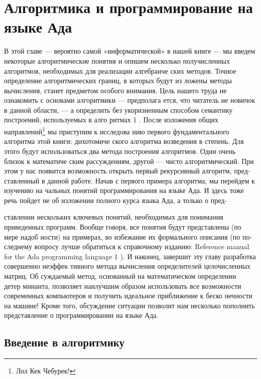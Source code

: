 \documentclass{mai_book}
\begin{document}
\chapter{Алгоритмика и \newline программирование на \newline языке Ада}
 
В этой главе — вероятно самой «информатической» в нашей книге —
мы введем некоторые алгоритмические понятия и опишем несколько
получисленных алгоритмов, необходимых для реализации алгебраиче­
ских методов.
Точное определение алгоритмических границ, в которых будут из­
ложены методы вычисления, станет предметом особого внимания. Цель
нашего труда не ознакомить с основами алгоритмики — предполага­
ется, что читатель не новичок в данной области, — а определить без­
укоризненным способом семантику построений, используемых в алго­
ритмах 1 .
После изложения общих направлений\footnote{Лол Кек Чебурек!} мы приступим к исследова­
нию первого фундаментального алгоритма этой книги: дихотомиче­
ского алгоритма возведения в степень. Для этого будут использоваться
два метода построения алгоритмов. Один очень близок к математиче­
ским рассуждениям, другой — чисто алгоритмический. При этом у нас
появится возможность открыть первый рекурсивный алгоритм, пред­
ставленный в данной работе.
Начав с первого примера алгоритма, мы перейдем к изучению на­
чальных понятий программирования на языке Ада. И здесь тоже речь
пойдет не об изложении полного курса языка Ада, а только о пред-

\pagebreak
ставлении нескольких ключевых понятий, необходимых для понимания
приведенных программ.
Вообще говоря, все понятия будут представлены (по мере надоб­
ности) на примерах, во избежание их формального описания (по по­
следнему вопросу лучше обратиться к справочному изданию: Reference
manual for the Ada programming language 1 ).
И наконец, завершит эту главу разработка совершенно неэффек­
тивного метода вычисления определителей целочисленных матриц. Об­
суждаемый метод, основанный на математическом определении детер­
минанта, позволяет наилучшим образом использовать все возможности
современных компьютеров и получить идеальное приближение к беско­
нечности на машине! Кроме того, обсуждение ситуации позволит нам
несколько пополнить представление о программировании на языке Ада.

\section{Введение в алгоритмику}
\end{document}
